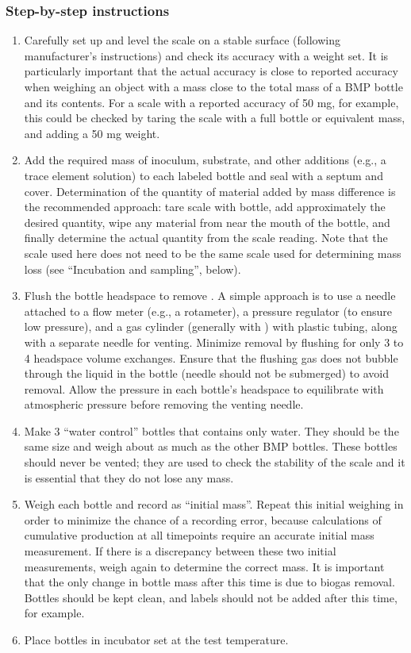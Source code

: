 \documentclass[]{article}
\begin{document}
\subsubsection{Step-by-step instructions}
\begin{enumerate}
  \item Carefully set up and level the scale on a stable surface (following manufacturer's instructions) and check its accuracy with a weight set. 
      It is particularly important that the actual accuracy is close to reported accuracy when weighing an object with a mass close to the total mass of a BMP bottle and its contents. 
      For a scale with a reported accuracy of 50 mg, for example, this could be checked by taring the scale with a full bottle or equivalent mass, and adding a 50 mg weight.
    \item Add the required mass of inoculum, substrate, and other additions (e.g., a trace element solution) to each labeled bottle and seal with a septum and cover. 
      Determination of the quantity of material added by mass difference is the recommended approach: tare scale with bottle, add approximately the desired quantity, wipe any material from near the mouth of the bottle, and finally determine the actual quantity from the scale reading. 
      Note that the scale used here does not need to be the same scale used for determining mass loss (see ``Incubation and sampling'', below).
    \item Flush the bottle headspace to remove . 
      A simple approach is to use a needle attached to a flow meter (e.g., a rotameter), a pressure regulator (to ensure low pressure), and a gas cylinder (generally with ) with plastic tubing, along with a separate needle for venting. 
      Minimize  removal by flushing for only 3 to 4 headspace volume exchanges. 
      Ensure that the flushing gas does not bubble through the liquid in the bottle (needle should not be submerged) to avoid  removal. 
      Allow the pressure in each bottle’s headspace to equilibrate with atmospheric pressure before removing the venting needle.
    \item Make 3 ``water control'' bottles that contains only water. 
      They should be the same size and weigh about as much as the other BMP bottles. 
      These bottles should never be vented; they are used to check the stability of the scale and it is essential that they do not lose any mass.
    \item Weigh each bottle and record as ``initial mass''. 
      Repeat this initial weighing in order to minimize the chance of a recording error, because calculations of cumulative  production at all timepoints require an accurate initial mass measurement.
      If there is a discrepancy between these two initial measurements, weigh again to determine the correct mass.
      It is important that the only change in bottle mass after this time is due to biogas removal.
      Bottles should be kept clean, and labels should not be added after this time, for example.
    \item Place bottles in incubator set at the test temperature.
\end{enumerate}
\end{document}
